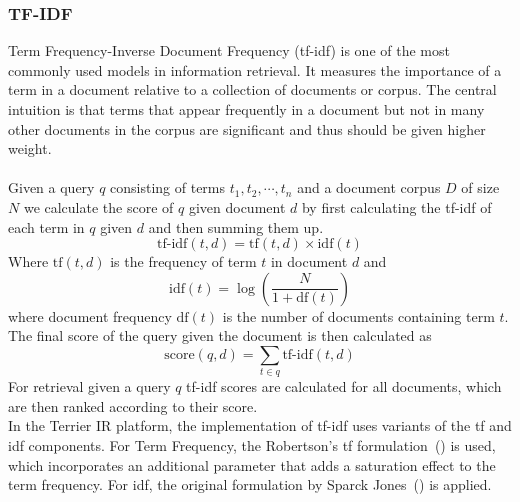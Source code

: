 \subsubsection{TF-IDF}\label{sec:tf-idf}
Term Frequency-Inverse Document Frequency (tf-idf) is one of the most commonly used models in information retrieval.
It measures the importance of a term in a document relative to a collection of documents or corpus.
The central intuition is that terms that appear frequently in a document but not in many other documents in the corpus are significant and thus should be given higher weight.
\\\\
Given a query \( q \) consisting of terms \( t_1,t_2,\cdots,t_n \) and a document corpus \( D \) of size \( N \) we calculate the score of \( q \) given document \( d \) by first calculating the tf-idf of each term  in \( q \) given \( d \) and then summing them up.
\[ \text{tf-idf}(t, d) = \text{tf}(t, d) \times \text{idf}(t) \]
Where \( \text{tf}(t, d) \) is the frequency of term \( t \) in document \( d \) and 
\[ \text{idf}(t) = \log \left( \frac{N}{1 + \text{df}(t)} \right) \]
where document frequency \( \text{df}(t) \) is the number of documents containing term \( t \).
The final score of the query given the document is then calculated as
\[ \text{score}(q, d) = \sum_{t \in q} \text{tf-idf}(t, d) \]
For retrieval given a query \( q \) tf-idf scores are calculated for all documents, which are then ranked according to their score.
\\
In the Terrier IR platform, the implementation of tf-idf uses variants of the tf and idf components.
For Term Frequency, the Robertson's tf formulation~(\cite{robertson:2004:Understanding}) is used, which incorporates an additional parameter that adds a saturation effect to the term frequency.
For idf, the original formulation by Sparck Jones~(\cite{sparck:1972:A}) is applied.


